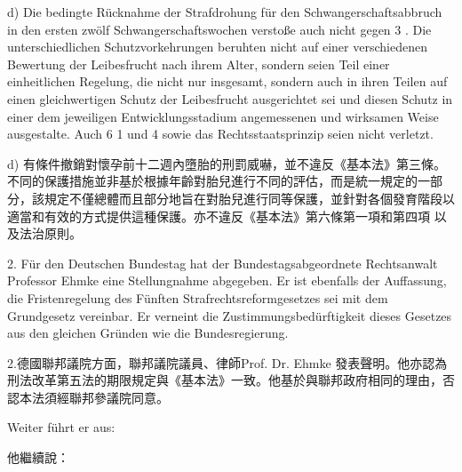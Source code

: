 \documentclass[12pt]{article}
\begin{document}
\syncleft
\begin{sourcepara}
d) Die bedingte Rücknahme der Strafdrohung für den Schwangerschaftsabbruch in den ersten zwölf Schwangerschaftswochen verstoße auch nicht gegen \abbrArt{} 3 \abbrGG{}\ggfnArtThreeDE{}. Die unterschiedlichen Schutzvorkehrungen beruhten nicht auf einer verschiedenen Bewertung der Leibesfrucht nach ihrem Alter, sondern seien Teil einer einheitlichen Regelung, die nicht nur insgesamt, sondern auch in ihren Teilen auf einen gleichwertigen Schutz der Leibesfrucht ausgerichtet sei und diesen Schutz in einer dem jeweiligen Entwicklungsstadium angemessenen und wirksamen Weise ausgestalte. Auch \abbrArt{} 6 \abbrAbs{} 1 und 4 \abbrGG{} sowie das Rechtsstaatsprinzip seien nicht verletzt.
\end{sourcepara}
\begin{transpara}
d) 有條件撤銷對懷孕前十二週內墮胎的刑罰威嚇，並不違反《基本法》第三條\ggfnArtThreeZH{}。不同的保護措施並非基於根據年齡對胎兒進行不同的評估，而是統一規定的一部分，該規定不僅總體而且部分地旨在對胎兒進行同等保護，並針對各個發育階段以適當和有效的方式提供這種保護。亦不違反《基本法》第六條第一項和第四項\ggfnArtSixOneFourZH{} 以及法治原則。
\end{transpara}

\syncleft
\begin{sourcepara}
2. Für den Deutschen Bundestag hat der Bundestagsabgeordnete Rechtsanwalt Professor \abbrDr{} Ehmke eine Stellungnahme abgegeben. Er ist ebenfalls der Auffassung, die Fristenregelung des Fünften Strafrechtsreformgesetzes sei mit dem Grundgesetz vereinbar. Er verneint die Zustimmungsbedürftigkeit dieses Gesetzes aus den gleichen Gründen wie die Bundesregierung.
\end{sourcepara}
\begin{transpara}
2.德國聯邦議院方面，聯邦議院議員、律師Prof. Dr. Ehmke 發表聲明。他亦認為刑法改革第五法的期限規定與《基本法》一致。他基於與聯邦政府相同的理由，否認本法須經聯邦參議院同意。
\end{transpara}

\syncleft
\begin{sourcepara}
Weiter führt er aus:
\end{sourcepara}
\begin{transpara}
他繼續說：
\end{transpara}
\end{document}

